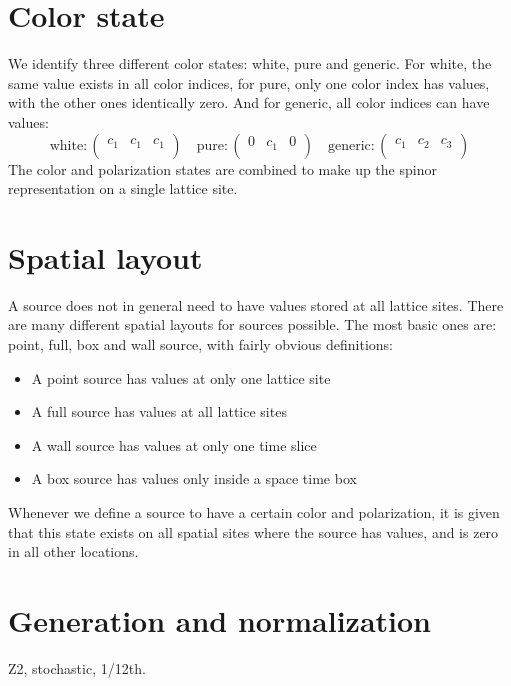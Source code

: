 \documentclass[a4paper,12pt,twoside]{article}
\begin{document}
\section{Color state}
We identify three different color states: white, pure and generic. For white, the same value exists in all color indices, for pure, only one color index has values, with the other ones identically zero. And for generic, all color indices can have values:
\begin{equation}
 \mathrm{white: }\left(
\begin{array}{ccc}
 c_1 & c_1 & c_1 \\
\end{array}
\right)\quad
 \mathrm{pure: }
 \left(
\begin{array}{ccc}
 0 & c_1 & 0 \\
\end{array}
\right)\quad
 \mathrm{generic: }
\left(
\begin{array}{ccc}
 c_1 & c_2 & c_3 \\
\end{array}
\right)
\end{equation}
The color and polarization states are combined to make up the spinor representation on a single lattice site.
\section{Spatial layout}
A source does not in general need to have values stored at all lattice sites. There are many different spatial layouts for sources possible. The most basic ones are: point, full, box and wall source, with fairly obvious definitions:
\begin{itemize}
\item A point source has values at only one lattice site
\item A full source has values at all lattice sites
\item A wall source has values at only one time slice
\item A box source has values only inside a space time box
\end{itemize}
Whenever we define a source to have a certain color and polarization, it is given that this state exists on all spatial sites where the source has values, and is zero in all other locations.
\section{Generation and normalization}
Z2, stochastic, 1/12th.
\end{document}
